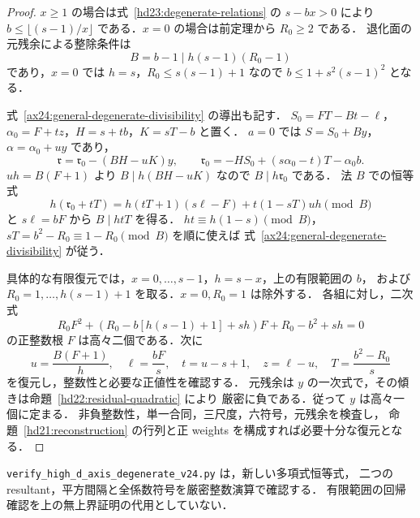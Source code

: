 \begin{proof}
$x\ge1$ の場合は式~\eqref{hd23:degenerate-relations} の $s-bx>0$ により
$b\le\lfloor(s-1)/x\rfloor$ である．$x=0$ の場合は前定理から $R_0\ge2$ である．
退化面の元残余による整除条件は
\begin{equation}\label{ax24:general-degenerate-divisibility}
 B=b-1\mid h(s-1)(R_0-1)
\end{equation}
であり，$x=0$ では $h=s$，$R_0\le s(s-1)+1$ なので
$b\le1+s^2(s-1)^2$ となる．

式~\eqref{ax24:general-degenerate-divisibility} の導出も記す．
$S_0=FT-Bt-\ell$，$\alpha_0=F+tz$，$H=s+tb$，$K=sT-b$ と置く．
$a=0$ では $S=S_0+By$，$\alpha=\alpha_0+uy$ であり，
\[
 \mathfrak r=\mathfrak r_0-(BH-uK)y,
 \qquad \mathfrak r_0=-HS_0+(s\alpha_0-t)T-\alpha_0b.
\]
$uh=B(F+1)$ より $B\mid h(BH-uK)$ なので $B\mid h\mathfrak r_0$ である．
法 $B$ での恒等式
\[
 h(\mathfrak r_0+tT)
 =h(tT+1)(s\ell-F)+t(1-sT)uh
 \pmod B
\]
と $s\ell=bF$ から $B\mid htT$ を得る．
$ht\equiv h(1-s)\pmod B$，$sT=b^2-R_0\equiv1-R_0\pmod B$ を順に使えば
式~\eqref{ax24:general-degenerate-divisibility} が従う．

具体的な有限復元では，$x=0,\ldots,s-1$，$h=s-x$，上の有限範囲の $b$，
および $R_0=1,\ldots,h(s-1)+1$ を取る．$x=0,R_0=1$ は除外する．
各組に対し，二次式
\[
 R_0F^2+(R_0-b[h(s-1)+1]+sh)F+R_0-b^2+sh=0
\]
の正整数根 $F$ は高々二個である．次に
\[
 u=\frac{B(F+1)}h,\quad \ell=\frac{bF}s,\quad
 t=u-s+1,\quad z=\ell-u,\quad T=\frac{b^2-R_0}s
\]
を復元し，整数性と必要な正値性を確認する．
元残余は $y$ の一次式で，その傾きは命題~\ref{hd22:residual-quadratic} により
厳密に負である．従って $y$ は高々一個に定まる．
非負整数性，単一合同，三尺度，六符号，元残余を検査し，
命題~\ref{hd21:reconstruction} の行列と正 weights を構成すれば必要十分な復元となる．
\end{proof}

\nolinkurl{verify_high_d_axis_degenerate_v24.py} は，新しい多項式恒等式，
二つの resultant，平方間隔と全係数符号を厳密整数演算で確認する．
有限範囲の回帰確認を上の無上界証明の代用としていない．

